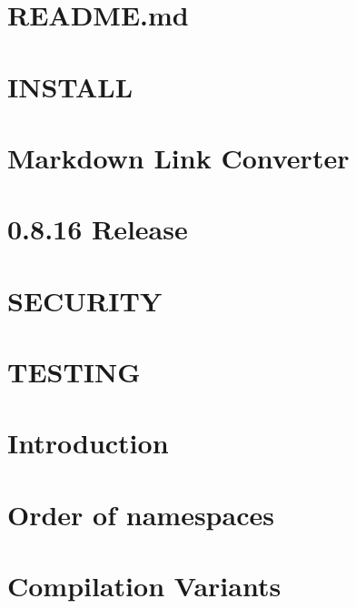 \documentclass[twoside]{book}
\newcommand{\+}{\discretionary{\mbox{\scriptsize$\hookleftarrow$}}{}{}}
\begin{document}
\chapter{R\+E\+A\+D\+M\+E.\+md}
\label{doc_images_README_md}
\hypertarget{doc_images_README_md}{}

\chapter{I\+N\+S\+T\+A\+L\+L}
\label{doc_INSTALL_md}
\hypertarget{doc_INSTALL_md}{}

\chapter{Markdown Link Converter}
\label{doc_markdownlinkconverter_README_md}
\hypertarget{doc_markdownlinkconverter_README_md}{}

\chapter{0.8.16 Release}
\label{doc_NEWS_md}
\hypertarget{doc_NEWS_md}{}

\chapter{S\+E\+C\+U\+R\+I\+T\+Y}
\label{doc_SECURITY_md}
\hypertarget{doc_SECURITY_md}{}

\chapter{T\+E\+S\+T\+I\+N\+G}
\label{doc_TESTING_md}
\hypertarget{doc_TESTING_md}{}

\chapter{Introduction}
\label{doc_tutorials_application-integration_md}
\hypertarget{doc_tutorials_application-integration_md}{}

\chapter{Order of namespaces}
\label{doc_tutorials_cascading_md}
\hypertarget{doc_tutorials_cascading_md}{}

\chapter{Compilation Variants}
\label{doc_tutorials_compilation-variants_md}
\hypertarget{doc_tutorials_compilation-variants_md}{}

\end{document}
